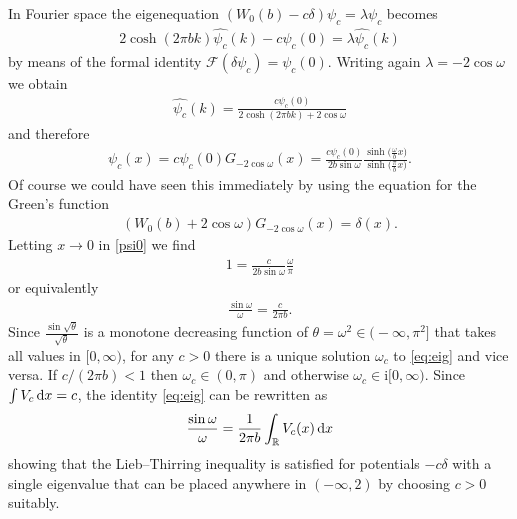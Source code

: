 \documentclass[pdftex]{sigma}%
\numberwithin{equation}{section}
\newcommand{\ii}{\mathrm{i}}
\newcommand{\R}{\mathbb{R}}
\begin{document}
In Fourier space the eigenequation $(W_0(b)-c\delta)\psi_c=\lambda\psi_c$ becomes
\begin{gather*}
2\cosh(2\pi b k)\widehat{\psi_c}(k)-c \psi_c(0)=\lambda\widehat{\psi_c}(k)
\end{gather*}
by means of the formal identity $\mathcal{F}(\delta\psi_c)=\psi_c(0)$. Writing again $\lambda=-2\cos\omega$ we obtain
\begin{gather}\label{eigenf}
\widehat{\psi_c}(k)=\frac{c\psi_c(0)}{2\cosh(2\pi bk)+2\cos\omega}
\end{gather}
and therefore
\begin{gather}\label{psi0}
\psi_c(x)=c\psi_c(0) G_{-2\cos\omega}(x)
=\frac{c\psi_c(0)}{2b\sin\omega}\frac{\sinh\big(\frac{\omega}{b}x\big)}{\sinh\big(\frac{\pi}{b}x\big)}.
\end{gather}
Of course we could have seen this immediately by using the equation for the Green's function
\begin{gather*}
(W_0(b)+2\cos\omega)G_{-2\cos\omega}(x)=\delta(x).
\end{gather*}
Letting $x\to0$ in \eqref{psi0} we find
\begin{gather*}
1=\frac{c}{2b\sin\omega}\frac{\omega}{\pi}
\end{gather*}
or equivalently
\begin{gather}
\frac{\sin\omega}{\omega}=\frac{c}{2\pi b}.\label{eq:eig}
\end{gather}
Since $\frac{\sin\sqrt{\theta}}{\sqrt{\theta}}$ is a monotone decreasing function of $\theta=\omega^2\in\big({-}\infty,\pi^2\big]$ that takes all values in $[0,\infty)$, for any $c>0$ there is a unique solution $\omega_c$ to \eqref{eq:eig} and vice versa. If $c/(2\pi b)<1$ then $\omega_c\in(0,\pi)$ and otherwise $\omega_c\in\ii[0,\infty)$. Since $\int V_c\, {\rm d} x=c$, the identity \eqref{eq:eig} can be rewritten as
\begin{gather*}
\frac{\sin\omega}{\omega}=\frac{1}{2\pi b}\int_{\R}V_c(x) \, {\rm d} x
\end{gather*}
showing that the Lieb--Thirring inequality is satisfied for potentials $-c\delta$ with a single eigenvalue that can be placed anywhere in $(-\infty,2)$ by choosing $c>0$ suitably.
\end{document}
